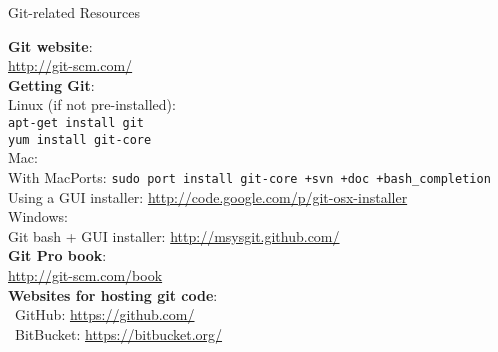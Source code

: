 \documentclass[12pt]{article}
\begin{document}
{\begin{center}
{\large Git-related Resources}
\end{center}
{\bf Git website}:\\
\url{http://git-scm.com/}\\

{\bf Getting Git}:\\
Linux (if not pre-installed):\\
\texttt{apt-get install git}\\
\texttt{yum install git-core}\\

Mac:\\
With MacPorts: \texttt{sudo port install git-core +svn +doc +bash{\_}completion}\\
Using a GUI installer: \url{http://code.google.com/p/git-osx-installer}\\

Windows:\\
Git bash + GUI installer: \url{http://msysgit.github.com/}\\

{\bf Git Pro book}:\\
\url{http://git-scm.com/book}\\

{\bf Websites for hosting git code}:\\
\textbullet\, GitHub: \url{https://github.com/}\\
\textbullet\, BitBucket: \url{https://bitbucket.org/}\\
} %
\end{document}
